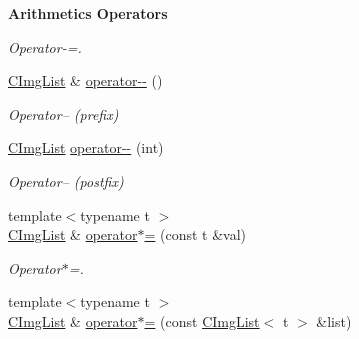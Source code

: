 \begin{Indent}{\bf Arithmetics Operators}
\begin{DoxyCompactItemize}
\begin{DoxyCompactList}\small\item\em Operator-\/=. \end{DoxyCompactList}\item 
\hypertarget{structcimg__library_1_1_c_img_list_a34a911b24c2b48df34c15042dfa2afd1}{\hyperlink{structcimg__library_1_1_c_img_list}{C\-Img\-List} \& \hyperlink{structcimg__library_1_1_c_img_list_a34a911b24c2b48df34c15042dfa2afd1}{operator-\/-\/} ()}\label{structcimg__library_1_1_c_img_list_a34a911b24c2b48df34c15042dfa2afd1}

\begin{DoxyCompactList}\small\item\em Operator-- (prefix) \end{DoxyCompactList}\item 
\hypertarget{structcimg__library_1_1_c_img_list_aed29492f2f6d8a86b16d391e08552917}{\hyperlink{structcimg__library_1_1_c_img_list}{C\-Img\-List} \hyperlink{structcimg__library_1_1_c_img_list_aed29492f2f6d8a86b16d391e08552917}{operator-\/-\/} (int)}\label{structcimg__library_1_1_c_img_list_aed29492f2f6d8a86b16d391e08552917}

\begin{DoxyCompactList}\small\item\em Operator-- (postfix) \end{DoxyCompactList}\item 
\hypertarget{structcimg__library_1_1_c_img_list_acb551f4e69beb5541cbf7333aef3f1b0}{{\footnotesize template$<$typename t $>$ }\\\hyperlink{structcimg__library_1_1_c_img_list}{C\-Img\-List} \& \hyperlink{structcimg__library_1_1_c_img_list_acb551f4e69beb5541cbf7333aef3f1b0}{operator$\ast$=} (const t \&val)}\label{structcimg__library_1_1_c_img_list_acb551f4e69beb5541cbf7333aef3f1b0}

\begin{DoxyCompactList}\small\item\em Operator$\ast$=. \end{DoxyCompactList}\item 
\hypertarget{structcimg__library_1_1_c_img_list_acdeb9d8927bf2046c3e0269ae584aef9}{{\footnotesize template$<$typename t $>$ }\\\hyperlink{structcimg__library_1_1_c_img_list}{C\-Img\-List} \& \hyperlink{structcimg__library_1_1_c_img_list_acdeb9d8927bf2046c3e0269ae584aef9}{operator$\ast$=} (const \hyperlink{structcimg__library_1_1_c_img_list}{C\-Img\-List}$<$ t $>$ \&list)}\label{structcimg__library_1_1_c_img_list_acdeb9d8927bf2046c3e0269ae584aef9}


\end{DoxyCompactItemize}
\end{Indent}

